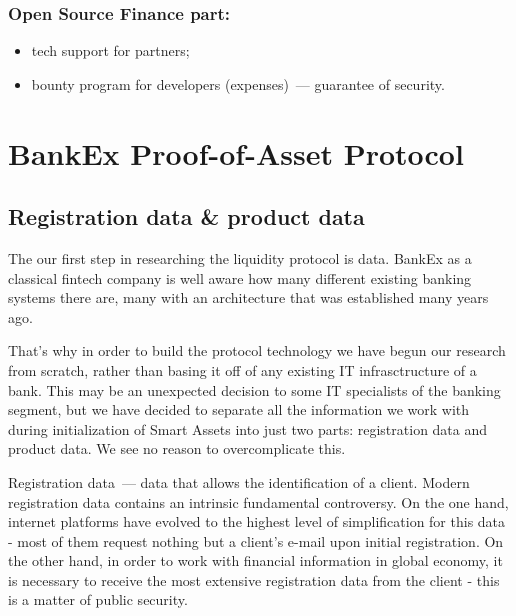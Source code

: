 \documentclass{article}
\begin{document}
\begin{multicols}{2}
\subsubsection*{Open Source Finance part:}

\begin{itemize}
\item tech support for partners;
\item bounty program for developers (expenses)~--- guarantee of security.
\end{itemize}

\section{BankEx Proof-of-Asset Protocol}

\subsection{Registration data \& product data}

The our first step in researching the liquidity protocol is data. BankEx as a classical fintech company is well aware how many different existing banking systems there are, many with an architecture that was established many years ago.

That’s why in order to build the protocol technology we have begun our research from scratch, rather than basing it off of any existing IT infrasctructure of a bank. This may be an unexpected decision to some IT specialists of the banking segment, but we have decided to separate all the information we work with during initialization of Smart Assets into just two parts: registration data and product data. We see no reason to overcomplicate this.

Registration data~--- data that allows the identification of a client. Modern registration data contains an intrinsic fundamental controversy. On the one hand, internet platforms have evolved to the highest level of simplification for this data - most of them request nothing but a client’s e-mail upon initial registration. On the other hand, in order to work with financial information in global economy, it is necessary to receive the most extensive registration data from the client - this is a matter of public security.


\end{multicols}
\end{document}
